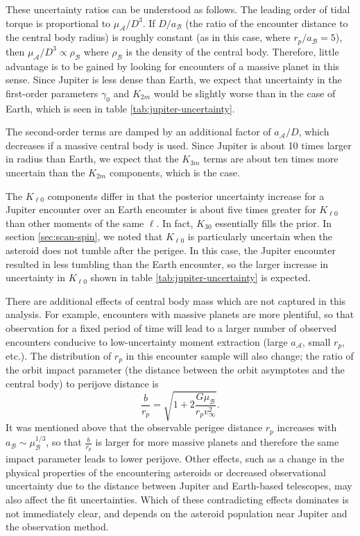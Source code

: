 \documentclass[fleqn,usenatbib]{mnras}
\begin{document}
These uncertainty ratios can be understood as follows. The leading order of tidal torque is proportional to $\mu_\mathcal{A} / D^3$. If $D/a_\mathcal{B}$ (the ratio of the encounter distance to the central body radius) is roughly constant (as in this case, where $r_p/a_\mathcal{B}=5$), then $\mu_\mathcal{A} / D^3 \propto \rho_\mathcal{B}$ where $\rho_\mathcal{B}$ is the density of the central body. Therefore, little advantage is to be gained by looking for encounters of a massive planet in this sense. Since Jupiter is less dense than Earth, we expect that uncertainty in the first-order parameters $\gamma_0$ and $K_{2m}$ would be slightly worse than in the case of Earth, which is seen in table \ref{tab:jupiter-uncertainty}.

The second-order terms are damped by an additional factor of $a_\mathcal{A}/D$, which decreases if a massive central body is used. Since Jupiter is about 10 times larger in radius than Earth, we expect that the $K_{3m}$ terms are about ten times more uncertain than the $K_{2m}$ components, which is the case.

The $K_{\ell 0}$ components differ in that the posterior uncertainty increase for a Jupiter encounter over an Earth encounter is about five times greater for $K_{\ell 0}$ than other moments of the same $\ell$. In fact, $K_{30}$ essentially fills the prior. In section \ref{sec:scan-spin}, we noted that $K_{\ell 0}$ is particularly uncertain when the asteroid does not tumble after the perigee. In this case, the Jupiter encounter resulted in less tumbling than the Earth encounter, so the larger increase in uncertainty in $K_{\ell 0}$ shown in table \ref{tab:jupiter-uncertainty} is expected.

There are additional effects of central body mass which are not captured in this analysis. For example, encounters with massive planets are more plentiful, so that observation for a fixed period of time will lead to a larger number of observed encounters conducive to low-uncertainty moment extraction (large $a_\mathcal{A}$, small $r_p$, etc.). The distribution of $r_p$ in this encounter sample will also change; the ratio of the orbit impact parameter (the distance between the orbit asymptotes and the central body) to perijove distance is 
\begin{equation}
  \frac{b}{r_p} = \sqrt{1+2\frac{G\mu_\mathcal{B}}{r_p v_\infty^2}}.
\end{equation}
It was mentioned above that the observable perigee distance $r_p$ increases with $a_\mathcal{B} \sim \mu_\mathcal{B}^{1/3}$, so that $\frac{b}{r_p}$ is larger for more massive planets and therefore the same impact parameter leads to lower perijove. Other effects, such as a change in the physical properties of the encountering asteroids or decreased observational uncertainty due to the distance between Jupiter and Earth-based telescopes, may also affect the fit uncertainties. Which of these contradicting effects dominates is not immediately clear, and depends on the asteroid population near Jupiter and the observation method.
\end{document}
